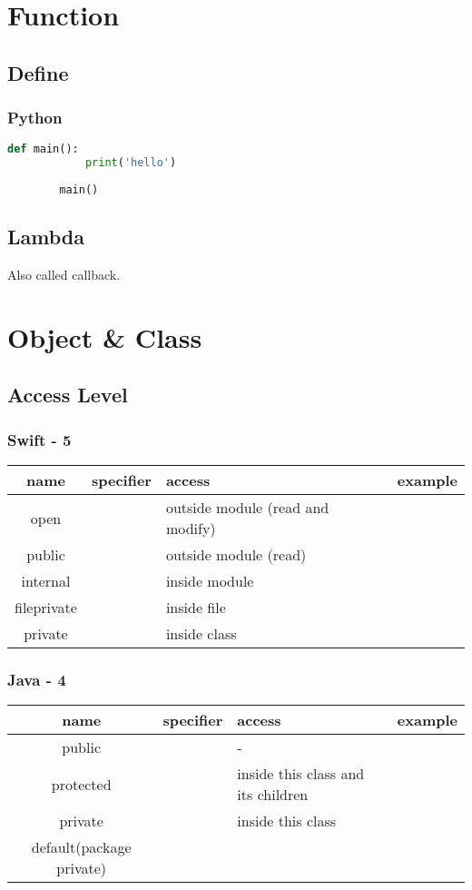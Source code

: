 \documentclass[12pt, a4pape]{article}
\begin{document}
\section{Function}
	\subsection{Define}
		\subsubsection{Python}
		\begin{lstlisting}[language={python}]
		def main():
   			print('hello')
			
		main()
		\end{lstlisting}
	
	\subsection{Lambda}
	Also called callback.
	
\section{Object \& Class}
	\subsection{Access Level}
		\subsubsection{Swift - 5}
		\begin{table}[H]
		\centering
		\begin{tabular}{|c|c|l|c|}
		\toprule
		name & specifier & access & example \\
		\hline
		open & & outside module (read and modify) & \\
		\hline
		public & & outside module (read) & \\
		\hline
		internal & & inside module & \\
		\hline
		fileprivate & & inside file & \\
		\hline
		private & & inside class & \\
		\bottomrule
		\end{tabular}
		\end{table}
		
		\subsubsection{Java - 4}
		\begin{table}[H]
		\centering
		\begin{tabular}{|c|c|l|c|}
		\toprule
		name & specifier & access & example \\
		\hline
		public & & - & \\
		\hline
		protected & & inside this class and its children & \\
		\hline
		private & & inside this class & \\
		\hline
		default(package private) & & & \\
		\bottomrule
		\end{tabular}
		\end{table}
		
\end{document}
